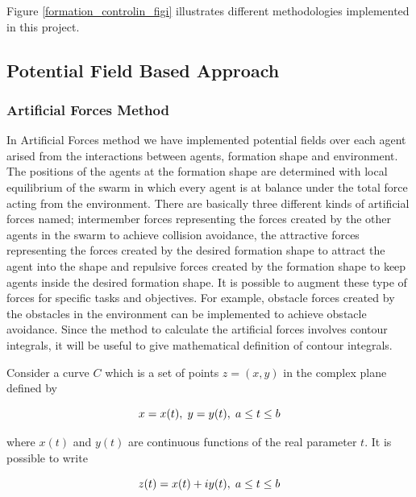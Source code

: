 Figure \ref{formation_controlin_figi} illustrates different methodologies implemented in this project.	
		
\subsection{Potential Field Based Approach}

\subsubsection{Artificial Forces Method} \label{Artificial Forces Ref} \label{Artificial_forces_ref}
In Artificial Forces method we have implemented potential fields over each agent arised from the interactions between agents, formation shape and environment. The positions of the agents at the formation shape  are determined with local equilibrium of the swarm in which every agent is at balance under the total force acting from the environment. There are basically three different kinds of artificial forces named; intermember forces representing the forces created by the other agents in the swarm to achieve collision avoidance, the attractive forces representing the forces created by the desired formation shape to attract the agent into the shape and repulsive forces created by the formation shape to keep agents inside the desired formation shape. It is possible to augment these type of forces for specific tasks and objectives. For example, obstacle forces created by the obstacles in the environment can be implemented to achieve obstacle avoidance. Since the method to calculate the artificial forces involves contour integrals, it will be useful to give mathematical definition of contour integrals.
		
Consider a curve $C$ which is a set of points $z = (x,y)$ in the complex plane defined by \cite{wiki_contour}

\begin{equation}
x = x(t),   \hspace{0.1cm} y = y(t),  \hspace{0.1cm} a\leq t \leq b
\end{equation}

where $x(t)$ and $y(t)$ are continuous functions of the real parameter $t$.  It is possible to write
		
\begin{equation}
z(t) = x(t)+iy(t),   \hspace{0.1cm} a\leq t \leq b
\end{equation}
		
